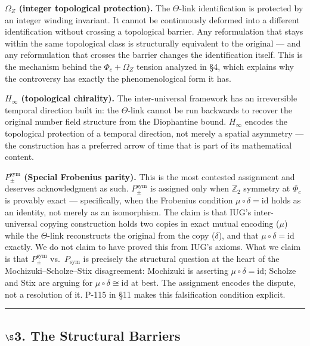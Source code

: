 \documentclass[10pt,a4paper]{article}
\begin{document}
\textbf{$\Omega_Z$ (integer topological protection).}
The $\Theta$-link identification is protected by an integer winding invariant.
It cannot be continuously deformed into a different identification without crossing a
topological barrier.
Any reformulation that stays within the same topological class is structurally equivalent
to the original --- and any reformulation that crosses the barrier changes the identification
itself.
This is the mechanism behind the $\Phi_c + \Omega_Z$ tension analyzed in \S4,
which explains why the controversy has exactly the phenomenological form it has.

\textbf{$H_{\infty}$ (topological chirality).}
The inter-universal framework has an irreversible temporal direction built in:
the $\Theta$-link cannot be run backwards to recover the original number field structure
from the Diophantine bound.
$H_{\infty}$ encodes the topological protection of a temporal direction,
not merely a spatial asymmetry --- the construction has a preferred arrow of time
that is part of its mathematical content.

\textbf{$P_{\pm}^{\text{sym}}$ (Special Frobenius parity).}
This is the most contested assignment and deserves acknowledgment as such.
$P_{\pm}^{\text{sym}}$ is assigned only when $\mathbb{Z}_2$ symmetry at $\Phi_c$
is provably exact --- specifically, when the Frobenius condition $\mu \circ \delta = \text{id}$
holds as an identity, not merely as an isomorphism.
The claim is that IUG's inter-universal copying construction holds two copies in exact mutual
encoding ($\mu$) while the $\Theta$-link reconstructs the original from the copy ($\delta$),
and that $\mu \circ \delta = \text{id}$ exactly.
We do not claim to have proved this from IUG's axioms.
What we claim is that $P_{\pm}^{\text{sym}}$ vs.\ $P_\text{sym}$ is precisely the structural
question at the heart of the Mochizuki--Scholze--Stix disagreement:
Mochizuki is asserting $\mu \circ \delta = \text{id}$;
Scholze and Stix are arguing for $\mu \circ \delta \cong \text{id}$ at best.
The assignment encodes the dispute, not a resolution of it.
P-115 in \S11 makes this falsification condition explicit.

\begin{center}
\rule{0.5\textwidth}{0.4pt}
\end{center}

\subsection{$\S$3. The Structural Barriers}
\end{document}
